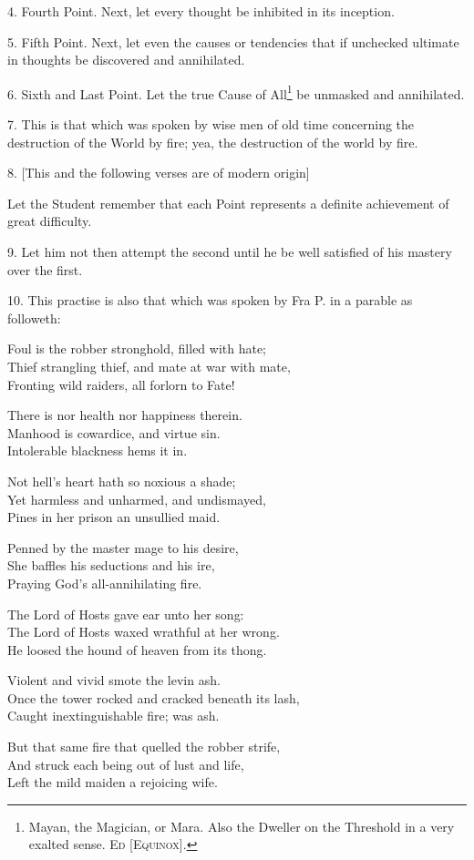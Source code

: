 4. Fourth Point. Next, let every thought be inhibited in its inception.

5. Fifth Point. Next, let even the causes or tendencies that if unchecked ultimate in thoughts be discovered and annihilated.

6. Sixth and Last Point. Let the true Cause of All\footnote{Mayan, the Magician, or Mara. Also the Dweller on the Threshold in a very exalted sense. \textsc{Ed [Equinox]}.} be unmasked and annihilated.

7. This is that which was spoken by wise men of old time concerning the destruction of the World by fire; yea, the destruction of the world by fire.

8. [This and the following verses are of modern origin]

Let the Student remember that each Point represents a definite achievement of great difficulty.

9. Let him not then attempt the second until he be well satisfied of his mastery over the first.

10. This practise is also that which was spoken by Fra P. in a parable as followeth: \begin{tightverse}
 Foul is the robber stronghold, filled with hate; \\
Thief strangling thief, and mate at war with mate, \\
Fronting wild raiders, all forlorn to Fate! 

There is nor health nor happiness therein. \\
Manhood is cowardice, and virtue sin. \\
Intolerable blackness hems it in. 

Not hell’s heart hath so noxious a shade; \\
Yet harmless and unharmed, and undismayed, \\
Pines in her prison an unsullied maid. 

Penned by the master mage to his desire, \\
She baffles his seductions and his ire, \\
Praying God’s all-annihilating fire. 

The Lord of Hosts gave ear unto her song: \\
The Lord of Hosts waxed wrathful at her wrong. \\
He loosed the hound of heaven from its thong. 

Violent and vivid smote the levin ash. \\
Once the tower rocked and cracked beneath its lash, \\
Caught inextinguishable fire; was ash. 

But that same fire that quelled the robber strife, \\
And struck each being out of lust and life, \\
Left the mild maiden a rejoicing wife. 
\end{tightverse}

